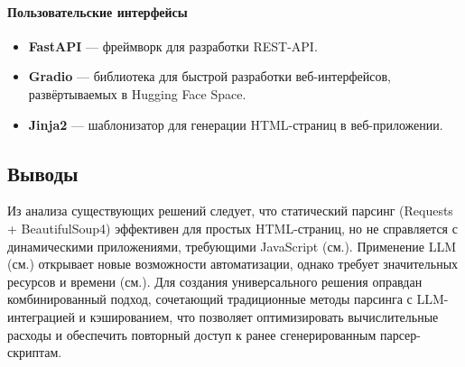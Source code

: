 \paragraph{Пользовательские интерфейсы}
\begin{itemize}
    \item \textbf{FastAPI}\cite{FastAPIDocumentation} — фреймворк для разработки REST-API.
    \item \textbf{Gradio}\cite{GradioDocumentation} — библиотека для быстрой разработки веб-интерфейсов, развёртываемых в Hugging Face Space.
    \item \textbf{Jinja2}\cite{Jinja2Documentation} — шаблонизатор для генерации HTML-страниц в веб-приложении.
\end{itemize}

\subsection{Выводы}

Из анализа существующих решений следует, что статический парсинг (Requests + BeautifulSoup4) эффективен для простых HTML-страниц, но не справляется с динамическими приложениями, требующими JavaScript (см.\cite{SeleniumDocumentation}). Применение LLM (см.\cite{Brown2020}) открывает новые возможности автоматизации, однако требует значительных ресурсов и времени (см.\cite{OpenAI2023Costs}). Для создания универсального решения оправдан комбинированный подход, сочетающий традиционные методы парсинга с LLM-интеграцией и кэшированием, что позволяет оптимизировать вычислительные расходы и обеспечить повторный доступ к ранее сгенерированным парсер-скриптам.
